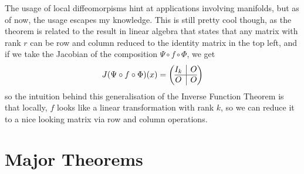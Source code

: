 \documentclass{article}
\theoremstyle{plain} %
\numberwithin{thm}{section} %
\theoremstyle{definition}
\begin{document}
    The usage of local diffeomorpisms hint at applications involving manifolds, but as of now, the usage escapes my knowledge. This is still pretty cool though, as the theorem is related to the result in linear algebra that states that any matrix with rank \(r\) can be row and column reduced to the identity matrix in the top left, and if we take the Jacobian of the composition \(\Psi \circ f \circ \Phi\), we get
    \[
        J (\Psi \circ f \circ \Phi)(x) = \left( \begin{array}{@{}c|c@{}}
            I_k & O \\
            \hline 
            O & O \\
        \end{array} \right) 
    \]
    so the intuition behind this generalisation of the Inverse Function Theorem is that locally, \(f\) looks like a linear transformation with rank \(k\), so we can reduce it to a nice looking matrix via row and column operations.

    \section{Major Theorems}
\end{document}
